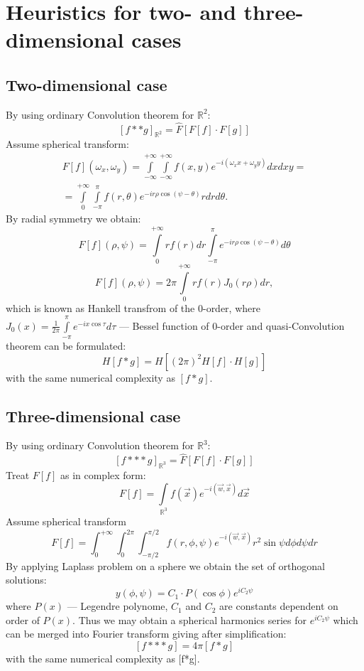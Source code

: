 \documentclass[%
 aip,
rsi,%
 amsmath,amssymb,
 reprint,%
]{revtex4-1}
\begin{document}
\section{Heuristics for two- and three-dimensional cases}

\label{sec:appB}

\subsection{Two-dimensional case}
By using ordinary Convolution theorem for $\mathbb{R}^2$:
\[[f**g]_{\mathbb{R}^2}=\hat{F}[F[f]\cdot F[g]]\]
Assume spherical transform:
\begin{multline*}
F[f](\omega_x, \omega_y)=\int\limits_{-\infty}^{+\infty}\int\limits_{-\infty}^{+\infty}f(x,y)e^{-i(\omega_x x+\omega_y y)}dxdxy=\\
=\int\limits_{0}^{+\infty}\int\limits_{-\pi}^{\pi}f(r,\theta)e^{-ir\rho\cos(\psi-\theta)}rdrd\theta.
\end{multline*}
By radial symmetry we obtain:
\[
F[f](\rho,\psi)=\int\limits_{0}^{+\infty}rf(r)dr\int\limits_{-\pi}^{\pi}e^{-ir\rho\cos(\psi-\theta)}d\theta
\]
\[
F[f](\rho,\psi)=2\pi\int\limits_{0}^{+\infty}rf(r)J_0(r\rho )dr,
\]
which is known as Hankell transfrom of the 0-order, where $
J_0(x)=\frac{1}{2\pi}\int\limits_{-\pi}^{\pi}e^{-ix\cos\tau}d\tau$ --- Bessel function of 0-order and quasi-Convolution theorem can be formulated:
\[
H[f*g]=H[(2\pi)^2 H[f] \cdot H[g]]
\]
with the same numerical complexity as $[f*g]$.

\subsection{Three-dimensional case}

By using ordinary Convolution theorem for $\mathbb{R}^3$:
\[[f***g]_{\mathbb{R}^3}=\hat{F}[F[f]\cdot F[g]]\]
Treat $F[f]$ as in complex form:
$$
F[f]=\int\limits_{\mathbb{R}^3}f(\vec{x})e^{-i(\vec{w},\vec{x})}d\vec{x}
$$
Assume spherical transform 
$$
F[f]=\int_0^{+\infty}\int_0^{2\pi}\int_{-\pi/2}^{\pi/2}f(r, \phi, \psi)e^{-i(\vec{w},\vec{x})}r^2\sin \psi d\phi d\psi dr
$$
By applying Laplass problem on a sphere we obtain the set of orthogonal solutions:
$$
	y(\phi, \psi)=C_1\cdot P(\cos \phi )e^{iC_2 \psi}
$$
where $P(x)$ --- Legendre polynome, $C_1$ and $C_2$ are constants dependent on order of $P(x)$. Thus we may obtain a spherical harmonics series for $e^{iC_2\psi}$ which can be merged into Fourier transform giving after simplification:
\[
[f***g]=4\pi[f*g]
\]
with the same numerical complexity as [f*g]. 
\end{document}
